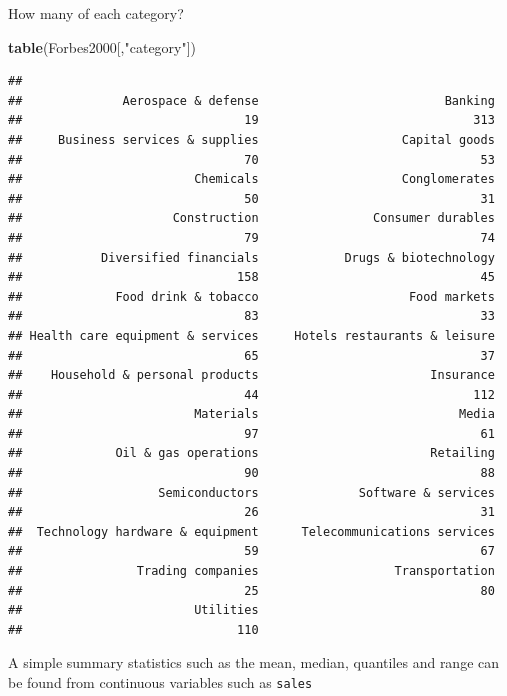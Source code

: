 \documentclass[]{article}
\newenvironment{Shaded}{\begin{snugshade}}{\end{snugshade}}
\newcommand{\KeywordTok}[1]{\textcolor[rgb]{0.13,0.29,0.53}{\textbf{{#1}}}}
\newcommand{\StringTok}[1]{\textcolor[rgb]{0.31,0.60,0.02}{{#1}}}
\newcommand{\NormalTok}[1]{{#1}}
\numberwithin{equation}{section}
\begin{document}
How many of each category?

\begin{Shaded}
\begin{Highlighting}[]
\KeywordTok{table}\NormalTok{(Forbes2000[,}\StringTok{"category"}\NormalTok{])}
\end{Highlighting}
\end{Shaded}

\begin{verbatim}
## 
##              Aerospace & defense                          Banking 
##                               19                              313 
##     Business services & supplies                    Capital goods 
##                               70                               53 
##                        Chemicals                    Conglomerates 
##                               50                               31 
##                     Construction                Consumer durables 
##                               79                               74 
##           Diversified financials            Drugs & biotechnology 
##                              158                               45 
##             Food drink & tobacco                     Food markets 
##                               83                               33 
## Health care equipment & services     Hotels restaurants & leisure 
##                               65                               37 
##    Household & personal products                        Insurance 
##                               44                              112 
##                        Materials                            Media 
##                               97                               61 
##             Oil & gas operations                        Retailing 
##                               90                               88 
##                   Semiconductors              Software & services 
##                               26                               31 
##  Technology hardware & equipment      Telecommunications services 
##                               59                               67 
##                Trading companies                   Transportation 
##                               25                               80 
##                        Utilities 
##                              110
\end{verbatim}

A simple summary statistics such as the mean, median, quantiles and
range can be found from continuous variables such as \texttt{sales}
\end{document}
